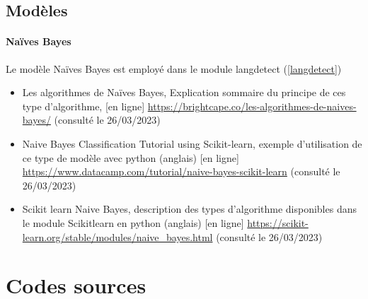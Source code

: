 \documentclass[a4paper,12pt]{article}
\begin{document}
		\subsection{Modèles}
			\paragraph{Naïves Bayes}
				Le modèle Naïves Bayes est employé dans le module langdetect (\ref{langdetect})
			\begin{itemize}
				\item Les algorithmes de Naïves Bayes, Explication sommaire du principe de ces type d'algorithme, [en ligne] \url{https://brightcape.co/les-algorithmes-de-naives-bayes/} (consulté le 26/03/2023)
				\item Naive Bayes Classification Tutorial using Scikit-learn, exemple d'utilisation de ce type de modèle avec python (anglais) [en ligne] \url{https://www.datacamp.com/tutorial/naive-bayes-scikit-learn} (consulté le 26/03/2023)
				\item Scikit learn Naive Bayes, description des types d'algorithme disponibles dans le module Scikitlearn en python (anglais) [en ligne] \url{https://scikit-learn.org/stable/modules/naive_bayes.html} (consulté le 26/03/2023)
			\end{itemize}
			
	\section{Codes sources}
			
\end{document}
